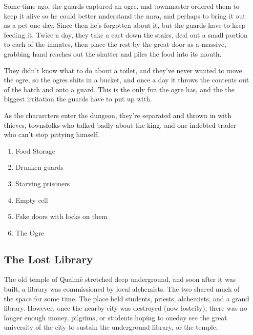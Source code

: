 Some time ago, the guards captured an ogre, and \gls{townmaster} ordered them to keep it alive so he could better understand the nura, and perhaps to bring it out as a pet one day.  Since then he's forgotten about it, but the guards have to keep feeding it.  Twice a day, they take a cart down the stairs, deal out a small portion to each of the inmates, then place the rest by the great door as a massive, grabbing hand reaches out the shutter and piles the food into its mouth.

They didn't know what to do about a toilet, and they've never wanted to move the ogre, so the ogres shits in a bucket, and once a day it throws the contents out of the hatch and onto a guard.  This is the only fun the ogre has, and the the biggest irritation the guards have to put up with.

As the chararcters enter the dungeon, they're separated and thrown in with thieves, townsfolks who talked badly about the king, and one indebted trader who can't stop pittying himself.

\begin{enumerate}

	\item{Food Storage}
	\item{Drunken guards}
	\item{Starving prisoners}
	\item{Empty cell}
	\item{Fake doors with locks on them}
	\item{The Ogre}

\end{enumerate}




\subsection{\hspace{4.5cm}The Lost Library}\label{sewers}\setcounter{list}{0}

\vspace{-1.2cm}

\label{sewer_map}

The old temple of Qualm\"{e} stretched deep underground, and soon after it was built, a library was commissioned by local alchemists.  The two shared much of the space for some time.  The place held students, priests, alchemists, and a grand library.  However, once the nearby city was destroyed (now \gls{lostcity}), there was no longer enough money, pilgrims, or students hoping to oneday see the great university of the city to sustain the underground library, or the temple.

